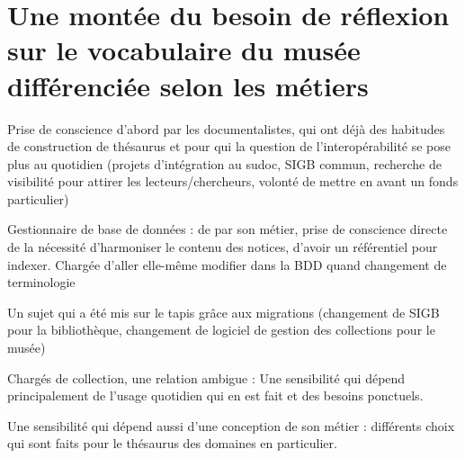 \section{\label{II-B-1}Une montée du besoin de réflexion sur le vocabulaire du musée différenciée selon les métiers }


Prise de conscience d'abord par les documentalistes, qui ont déjà des habitudes de construction de thésaurus et pour qui la question de l'interopérabilité se pose plus au quotidien (projets d'intégration au sudoc, SIGB commun, recherche de visibilité pour attirer les lecteurs/chercheurs, volonté de mettre en avant un fonds particulier) 

Gestionnaire de base de données : de par son métier, prise de conscience directe de la nécessité d'harmoniser le contenu des notices, d'avoir un référentiel pour indexer. Chargée d'aller elle-même modifier dans la BDD quand changement de terminologie 

Un sujet qui a été mis sur le tapis grâce aux migrations (changement de SIGB pour la bibliothèque, changement de logiciel de gestion des collections pour le musée) 

Chargés de collection, une relation ambigue : Une sensibilité qui dépend principalement de l’usage quotidien qui en est fait et des besoins ponctuels. 

Une sensibilité qui dépend aussi d’une conception de son métier : différents choix qui sont faits pour le thésaurus des domaines en particulier. 